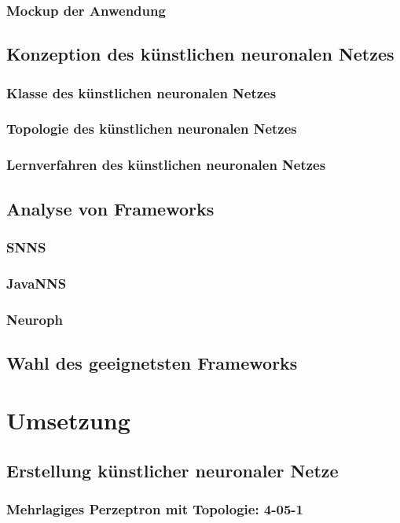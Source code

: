 \documentclass[11pt,a4paper]{scrreprt}
\begin{document}
		\subsection{Mockup der Anwendung} %
	\section{Konzeption des künstlichen neuronalen Netzes} %
		\subsection{Klasse des künstlichen neuronalen Netzes} %
		\subsection{Topologie des künstlichen neuronalen Netzes} %
		\subsection{Lernverfahren des künstlichen neuronalen Netzes} %
	\section{Analyse von Frameworks} %
		\subsection{SNNS} %
	  \subsection{JavaNNS}  %
		\subsection{Neuroph} %
	\section{Wahl des geeignetsten Frameworks} %
	
\chapter{Umsetzung} %
	\section{Erstellung künstlicher neuronaler Netze} %
		\subsection{Mehrlagiges Perzeptron mit Topologie: 4-05-1} %
\end{document}

